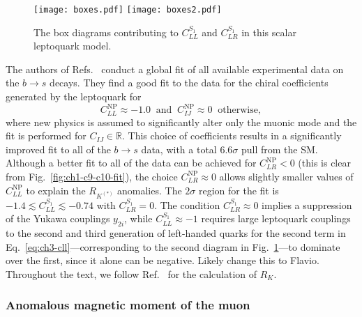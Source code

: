 \begin{figure}[t]%
  \centering
  \texttt{[image: boxes.pdf]}
  \qquad
  \texttt{[image: boxes2.pdf]}
  \caption{The box diagrams contributing to $C_{LL}^{S_{1}}$ and $C_{LR}^{S_{1}}$ in
    this scalar leptoquark model.}
  \label{fig:ch3-boxes}
\end{figure}

The authors of Refs.~\cite{Aebischer:2019mlg} conduct a global fit of all
available experimental data on the $b \rightarrow s$ decays. They find a good
fit to the data for the chiral coefficients generated by the leptoquark for
\begin{equation} \label{eq:ch3-cll12clr0}
  C_{LL}^{\text{NP}} \approx -1.0 \ \text{ and } \ C_{IJ}^{\text{NP}} \approx 0 \ \text{ otherwise},
\end{equation}
where new physics is assumed to significantly alter only the muonic mode and the
fit is performed for $C_{IJ} \in \mathbb{R}$. This choice of coefficients
results in a significantly improved fit to all of the $b \to s$ data, with a
total $6.6\sigma$ pull from the SM. Although a better fit to all of the data can
be achieved for $C_{LR}^{\text{NP}} < 0$ (this is clear from
Fig.~\ref{fig:ch1-c9-c10-fit}), the choice $C_{LR}^{\text{NP}}\approx 0$ allows
slightly smaller values of $C_{LL}^{\text{NP}}$ to explain the $R_{K^{(*)}}$
anomalies. The $2\sigma$ region for the fit is
$-1.4 \lesssim C_{LL}^{S_{1}} \lesssim -0.74$ with $C_{LR}^{S_{1}} = 0$. The
condition $C_{LR}^{S_{1}} \approx 0$ implies a suppression of the Yukawa
couplings $y_{2i}$, while $C_{LL}^{S_{1}} \approx -1$ requires large leptoquark
couplings to the second and third generation of left-handed quarks for the
second term in Eq.~\eqref{eq:ch3-cll}---corresponding to the second diagram in
Fig.~\ref{fig:ch3-boxes}---to dominate over the first, since it alone can be
negative. {\color{red}Likely change this to Flavio.} Throughout the text, we
follow Ref.~\cite{Becirevic:2016oho} for the calculation of $R_K$.

\subsubsection{Anomalous magnetic moment of the muon}
\label{sec:ch3-gminus2}

